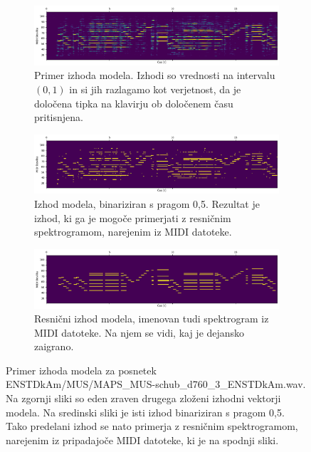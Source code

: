 \documentclass[a4paper, 12pt, openright]{book}
\begin{document}
\begin{figure}
    \centering
    \begin{subfigure}{.9\textwidth}
        \centering
        \includegraphics[width=\linewidth]{output.png}
        \caption{Primer izhoda modela. Izhodi so vrednosti na intervalu $ (0, 1) $ in si jih razlagamo kot verjetnost, da je določena tipka na klavirju ob določenem času pritisnjena.}
        \label{fig:out}
    \end{subfigure}
    \begin{subfigure}{.9\textwidth}
        \centering
        \includegraphics[width=\linewidth]{output_threshold.png}
        \caption{Izhod modela, binariziran s pragom 0,5. Rezultat je izhod, ki ga je mogoče primerjati z resničnim spektrogramom, narejenim iz MIDI datoteke.}
        \label{fig:out_thresh}
    \end{subfigure}
    \begin{subfigure}{.9\textwidth}
        \centering
        \includegraphics[width=\linewidth]{output_true.png}
        \caption{Resnični izhod modela, imenovan tudi spektrogram iz MIDI datoteke. Na njem se vidi, kaj je dejansko zaigrano.}
        \label{fig:out_real}
    \end{subfigure}
    \caption{Primer izhoda modela za posnetek ENSTDkAm/MUS/MAPS\_MUS-schub\_d760\_3\_ENSTDkAm.wav. \\ Na zgornji sliki so eden zraven drugega zloženi izhodni vektorji modela. Na sredinski sliki je isti izhod binariziran s pragom 0,5. Tako predelani izhod se nato primerja z resničnim spektrogramom, narejenim iz pripadajoče MIDI datoteke, ki je na spodnji sliki.}
    \label{fig:output}
\end{figure}
\end{document}
